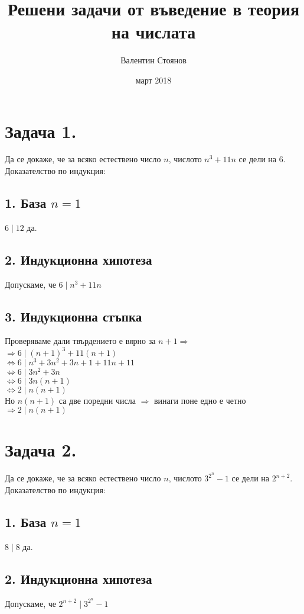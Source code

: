 \documentclass[12pt]{article}
\begin{document}
\title{Решени задачи от въведение в теория на числата}
\author{Валентин Стоянов}
\date{март 2018}
\maketitle

\section*{Задача 1.}
Да се докаже, че за всяко естествено число $n$, числото $n^3 + 11n$ се дели на 6.\\
Доказателство по индукция:\\
\subsection*{1. База $n = 1$}
$6 \mid 12$ да.
\subsection*{2. Индукционна хипотеза}
Допускаме, че $6 \mid n^3 + 11n$
\subsection*{3. Индукционна стъпка}
Проверяваме дали твърдението е вярно за $n+1 \Rightarrow$\\
$\Rightarrow 6 \mid (n+1)^3 + 11(n+1)$\\
$\Leftrightarrow 6 \mid n^3 +3n^2 + 3n + 1 + 11n + 11$\\
$\Leftrightarrow 6 \mid 3n^2 + 3n$\\
$\Leftrightarrow 6 \mid 3n(n + 1)$\\
$\Leftrightarrow 2 \mid n(n + 1)$\\
Но $n(n + 1)$ са две поредни числа $\Rightarrow$ винаги поне едно е четно
$\Rightarrow 2 \mid n(n + 1)$

\section*{Задача 2.}
Да се докаже, че за всяко естествено число $n$, числото $3^{2^n} - 1$ се дели на $2^{n + 2}$.\\
Доказателство по индукция:\\
\subsection*{1. База $n = 1$}
$8 \mid 8$ да.
\subsection*{2. Индукционна хипотеза}
Допускаме, че $2^{n + 2} \mid 3^{2^n} - 1$
\end{document}
